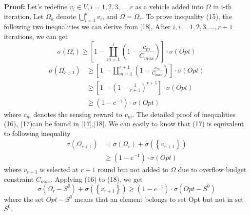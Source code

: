 \documentclass[journal]{IEEEtran}
\begin{document}
\noindent
\textbf{Proof:} Let’s redefine $v_{i}\in V,i=1,2,3,...,r$ as a vehicle added into $\Omega$ in i-th iteration, Let $\Omega_{k}$ denote $ \bigcup_{i=1}^{k}v_{i}$, and $\Omega =\Omega _{r}$. To prove inequality (15), the following two inequalities we can derive from [18], After $i,i=1,2,3,...,r+1$ iterations, we can get
\begin{equation}
\sigma (\Omega _{i})\geqslant \left [ 1-\coprod_{m=1}^{i}(1-\frac{c_{m}}{C_{max}}) \right ]\cdot \sigma (Opt)
\end{equation}
\begin{equation}
 \begin{aligned}
 \sigma (\Omega _{r+1})&\geqslant \left [ 1-\coprod_{m=1}^{r+1}(1-\frac{c_{m}}{C_{max}}) \right ]\cdot \sigma (Opt) \\ & \geqslant \left [ 1-\left ( 1-\frac{1}{r+1} \right )^{r+1} \right ]\cdot\sigma (Opt)\\&\geqslant \left (1-e^{-1}  \right )\cdot\sigma (Opt) 
 \end{aligned}
\end{equation}
 where $c_{m}$ denotes the sensing reward to $v_{m}$. The detailed proof of inequalities (16), (17)can be found in [17],[18]. We can easily to know that (17) is equivalent to following inequality
 \begin{equation}
	 \begin{aligned}
	 \sigma (\Omega _{r+1})&=\sigma(\Omega _{r})+\sigma(\left \{ v_{r+1}\right \})\\&\geqslant\left ( 1-e^{-1} \right ) \cdot \sigma (Opt)
	 \end{aligned}
 \end{equation}
 where $v_{r+1}$ is selected at $r+1$ round but not added to $\Omega$ due to overflow budget constraint $C_{max}$. Applying (16) to (18), we get
 \begin{equation}
 \sigma (\Omega _{r}-S^{0})+\sigma (\left \{ v_{r+1} \right \})\geqslant \left ( 1-e^{-1} \right )\cdot \sigma (Opt-S^{0})
 \end{equation}
 where the set $Opt-S^{0}$ means that an element belongs to set Opt but not in set $S^{0}$.
 
\end{document}

